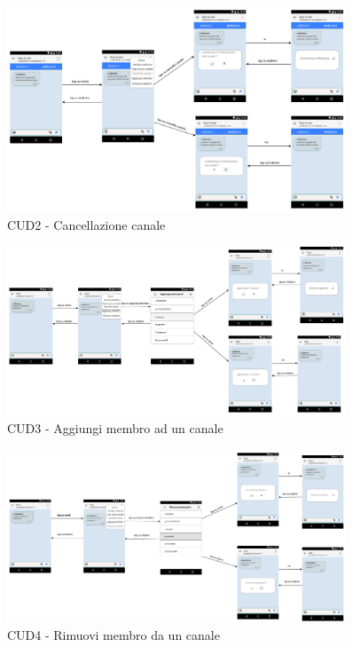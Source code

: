 \begin{figure}
	\centering
	\includegraphics[width=0.9\textwidth]{imgs/gruppo6/activities/act_cud2_cancella_canale.pdf}
	\caption{CUD2 - Cancellazione canale}
	\label{fig:cud2}
\end{figure}

\begin{figure}
	\centering
	\includegraphics[width=0.9\textwidth]{imgs/gruppo6/activities/act_cud3_aggiungi_membro_chat.pdf}
	\caption{CUD3 - Aggiungi membro ad un canale}
	\label{fig:cud3}
\end{figure}

\begin{figure}
	\centering
	\includegraphics[width=0.9\textwidth]{imgs/gruppo6/activities/act_cud4_rimuovi_membro_da_canale.pdf}
	\caption{CUD4 - Rimuovi membro da un canale}
	\label{fig:cud4}
\end{figure}

